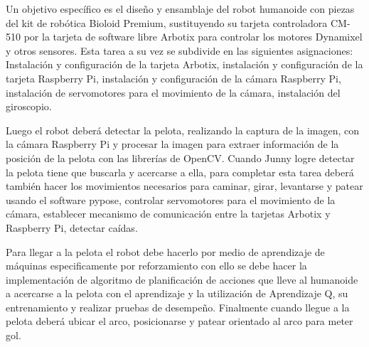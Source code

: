 

Un objetivo espec\'ifico es el diseño y ensamblaje del robot humanoide con piezas del kit de robótica Bioloid Premium, sustituyendo su tarjeta controladora CM-510 \cite{cm510} por la tarjeta de software libre Arbotix para controlar los motores Dynamixel y otros sensores. Esta tarea a su vez se subdivide en las siguientes asignaciones: Instalación y configuración de la tarjeta Arbotix, instalación y configuración de la tarjeta Raspberry Pi, instalación y configuración de la cámara Raspberry Pi, instalación de servomotores  para el movimiento de la cámara, instalación del giroscopio. 

Luego el robot deber\'a detectar la pelota, realizando la captura de la imagen, con la cámara Raspberry Pi y procesar la imagen para extraer información de la posición de la pelota con las librerías de OpenCV. Cuando Junny logre detectar la pelota tiene que buscarla y acercarse a ella, para completar esta tarea deber\'a tambi\'en hacer los movimientos necesarios para caminar, girar, levantarse y patear usando el software pypose, controlar servomotores para el movimiento de la cámara, establecer mecanismo de comunicación entre la tarjetas Arbotix y Raspberry Pi, detectar ca\'idas. 


Para llegar a la pelota el robot debe hacerlo por medio de aprendizaje de m\'aquinas especificamente por reforzamiento con ello se debe hacer la implementación de algoritmo de planificación de acciones que lleve al humanoide a acercarse a la pelota con el aprendizaje y la utilizaci\'on de Aprendizaje Q, su entrenamiento y realizar pruebas de desempe\~no. Finalmente cuando llegue a la pelota deber\'a ubicar el arco, posicionarse y patear orientado al arco para meter gol. 
    
